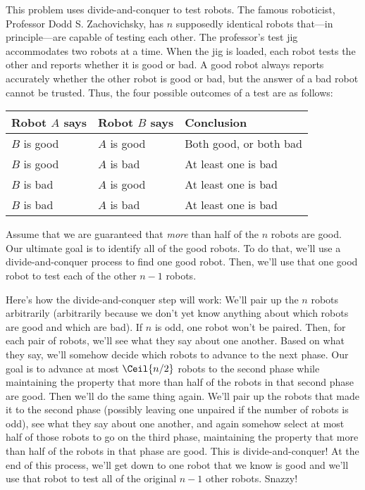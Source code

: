 \documentclass{ks-pset}
\begin{document}
\begin{solution}

\end{solution}

\begin{problem}

  This problem uses divide-and-conquer to test robots. The famous roboticist,
  Professor Dodd S. Zachovichsky, has \(n\) supposedly identical robots
  that---in principle---are capable of testing each other. The professor's test
  jig accommodates two robots at a time. When the jig is loaded, each robot
  tests the other and reports whether it is good or bad. A good robot always
  reports accurately whether the other robot is good or bad, but the answer of
  a bad robot cannot be trusted.  Thus, the four possible outcomes of a test
  are as follows:

  \begin{center}
    \begin{tabular}{lll}
      Robot \(A\) says & Robot \(B\) says & Conclusion \\ \midrule
      \(B\) is good & \(A\) is good & Both good, or both bad \\
      \(B\) is good & \(A\) is bad & At least one is bad \\
      \(B\) is bad & \(A\) is good & At least one is bad \\
      \(B\) is bad & \(A\) is bad & At least one is bad \\
    \end{tabular}
  \end{center}

  Assume that we are guaranteed that \emph{more} than half of the \(n\) robots
  are good.  Our ultimate goal is to identify all of the good robots.  To do
  that, we'll use a divide-and-conquer process to find one good robot.  Then,
  we'll use that one good robot to test each of the other \(n-1\) robots.

  Here's how the divide-and-conquer step will work: We'll pair up the \(n\)
  robots arbitrarily (arbitrarily because we don't yet know anything about
  which robots are good and which are bad).  If \(n\) is odd, one robot won't
  be paired.  Then, for each pair of robots, we'll see what they say about one
  another.  Based on what they say, we'll somehow decide which robots to
  advance to the next phase.  Our goal is to advance at most \(\Ceil{n/2}\)
  robots to the second phase while maintaining the property that more than half
  of the robots in that second phase are good.  Then we'll do the same thing
  again. We'll pair up the robots that made it to the second phase (possibly
  leaving one unpaired if the number of robots is odd), see what they say about
  one another, and again somehow select at most half of those robots to go on
  the third phase, maintaining the property that more than half of the robots
  in that phase are good.  This is divide-and-conquer!  At the end of this
  process, we'll get down to one robot that we know is good and we'll use that
  robot to test all of the original \(n-1\) other robots.  Snazzy!


\end{problem}
\end{document}
